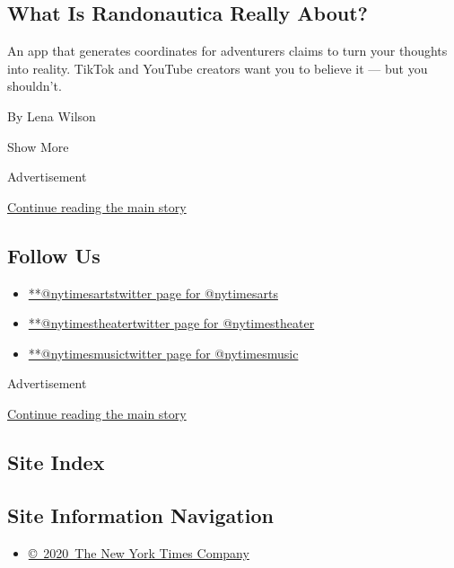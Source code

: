\begin{enumerate}
  \hypertarget{what-is-randonautica-really-about}{%
  \subsection{What Is Randonautica Really
  About?}\label{what-is-randonautica-really-about}}

  An app that generates coordinates for adventurers claims to turn your
  thoughts into reality. TikTok and YouTube creators want you to believe
  it --- but you shouldn't.

  By Lena Wilson
\end{enumerate}

Show More

Advertisement

\protect\hyperlink{after-mid2}{Continue reading the main story}

\hypertarget{follow-us}{%
\subsection{Follow Us}\label{follow-us}}

\begin{itemize}
\tightlist
\item
  \href{https://twitter.com/nytimesarts}{**@nytimesartstwitter page for
  @nytimesarts}
\item
  \href{https://twitter.com/nytimestheater}{**@nytimestheatertwitter
  page for @nytimestheater}
\item
  \href{https://twitter.com/nytimesmusic}{**@nytimesmusictwitter page
  for @nytimesmusic}
\end{itemize}

Advertisement

\protect\hyperlink{after-mktg}{Continue reading the main story}

\hypertarget{site-index}{%
\subsection{Site Index}\label{site-index}}

\hypertarget{site-information-navigation}{%
\subsection{Site Information
Navigation}\label{site-information-navigation}}

\begin{itemize}
\tightlist
\item
  \href{https://help.nytimes3xbfgragh.onion/hc/en-us/articles/115014792127-Copyright-notice}{©~2020~The
  New York Times Company}
\end{itemize}

